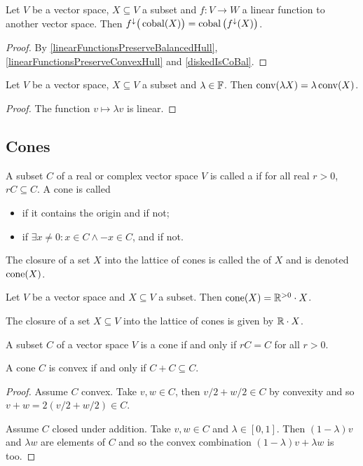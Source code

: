 \begin{lemma} \label{linearFunctionsPreserveDiskedHull}
Let $V$ be a vector space, $X\subseteq V$ a subset and $f: V\to W$ a linear function to another vector space. Then $f^\downarrow\big(\operatorname{cobal}(X)\big) = \operatorname{cobal}\big(f^\downarrow(X)\big)$. 
\end{lemma}
\begin{proof}
By \ref{linearFunctionsPreserveBalancedHull}, \ref{linearFunctionsPreserveConvexHull} and \ref{diskedIsCoBal}.
\end{proof}
\begin{corollary} \label{diskedHullHomogeneous}
Let $V$ be a vector space, $X\subseteq V$ a subset and $\lambda\in \mathbb{F}$. Then $\operatorname{conv}(\lambda X) = \lambda \operatorname{conv}(X)$.
\end{corollary}
\begin{proof}
The function $v\mapsto \lambda v$ is linear.
\end{proof}

\subsection{Cones}
\begin{definition}
A subset $C$ of a real or complex vector space $V$ is called a  if for all real $r>0$, $rC \subseteq C$. A cone is called
\begin{itemize}
\item {} if it contains the origin and  if not;
\item {} if $\exists x\neq 0: x\in C \land -x\in C$, and  if not.
\end{itemize}
The closure of a set $X$ into the lattice of cones is called the  of $X$ and is denoted $\operatorname{cone}(X)$.
\end{definition}

\begin{lemma}
Let $V$ be a vector space and $X\subseteq V$ a subset. Then $\operatorname{cone}(X) = \mathbb{R}^{> 0}\cdot X$.
\end{lemma}

The closure of a set $X\subseteq V$ into the lattice of cones is given by $\mathbb{R}\cdot X$.

\begin{lemma} \label{coneEqualityLemma}
A subset $C$ of a vector space $V$ is a cone \textup{if and only if} $rC = C$ for all $r> 0$.
\end{lemma}

\begin{lemma} \label{convexityAdditiveClosure}
A cone $C$ is convex if and only if $C + C \subseteq C$. 
\end{lemma}
\begin{proof}
Assume $C$ convex. Take $v,w\in C$, then $v/2 + w/2\in C$ by convexity and so $v+w = 2(v/2+w/2)\in C$.

Assume $C$ closed under addition. Take $v,w\in C$ and $\lambda\in[0,1]$. Then $(1-\lambda)v$ and $\lambda w$ are elements of $C$ and so the convex combination $(1-\lambda)v + \lambda w$ is too.
\end{proof}


